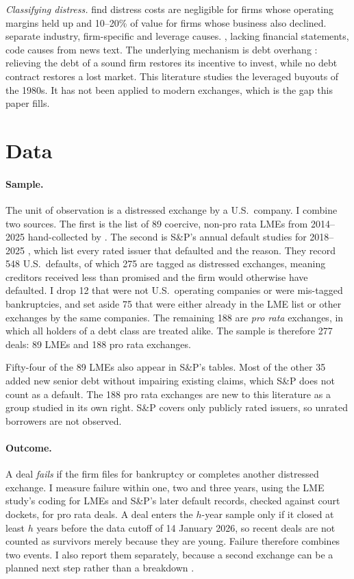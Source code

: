 \documentclass[12pt]{article}
\begin{document}
\emph{Classifying distress.} \citet{andrade1998} find distress costs are negligible for firms whose operating margins held up and 10--20\% of value for firms whose business also declined. \citet{asquith1994} separate industry, firm-specific and leverage causes. \citet{denis1995}, lacking financial statements, code causes from news text. The underlying mechanism is debt overhang \citep{myers1977}: relieving the debt of a sound firm restores its incentive to invest, while no debt contract restores a lost market. This literature studies the leveraged buyouts of the 1980s. It has not been applied to modern exchanges, which is the gap this paper fills. 


\section{Data}

\paragraph{Sample.} The unit of observation is a distressed exchange by a U.S.\ company. I combine two sources. The first is the list of 89 coercive, non-pro rata LMEs from 2014--2025 hand-collected by \citet{roerotaru2026}. The second is S\&P's annual default studies for 2018--2025 \citep{spdefault}, which list every rated issuer that defaulted and the reason. They record 548 U.S.\ defaults, of which 275 are tagged as distressed exchanges, meaning creditors received less than promised and the firm would otherwise have defaulted. I drop 12 that were not U.S.\ operating companies or were mis-tagged bankruptcies, and set aside 75 that were either already in the LME list or other exchanges by the same companies. The remaining 188 are \emph{pro rata} exchanges, in which all holders of a debt class are treated alike. The sample is therefore 277 deals: 89 LMEs and 188 pro rata exchanges.

Fifty-four of the 89 LMEs also appear in S\&P's tables. Most of the other 35 added new senior debt without impairing existing claims, which S\&P does not count as a default. The 188 pro rata exchanges are new to this literature as a group studied in its own right. S\&P covers only publicly rated issuers, so unrated borrowers are not observed.

\paragraph{Outcome.} A deal \emph{fails} if the firm files for bankruptcy or completes another distressed exchange. I measure failure within one, two and three years, using the LME study's coding for LMEs and S\&P's later default records, checked against court dockets, for pro rata deals. A deal enters the $h$-year sample only if it closed at least $h$ years before the data cutoff of 14 January 2026, so recent deals are not counted as survivors merely because they are young. Failure therefore combines two events. I also report them separately, because a second exchange can be a planned next step rather than a breakdown \citep{kahl2002}.
\end{document}
